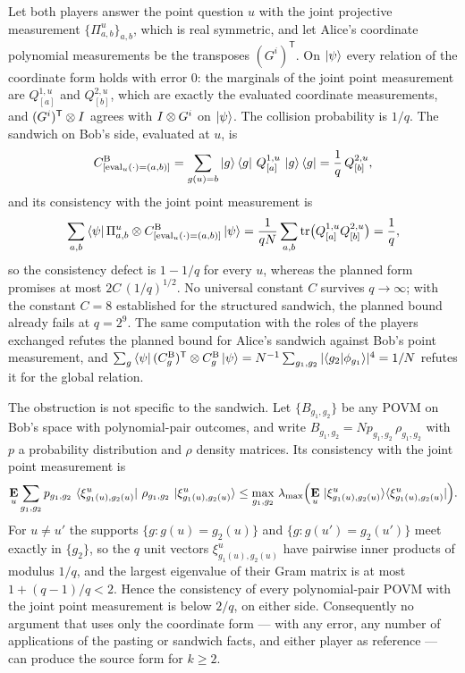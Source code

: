\documentclass[11pt]{article}
\begin{document}
Let both players answer the point question $u$ with the joint projective
measurement $\{\Pi^u_{a,b}\}_{a,b}$, which is real symmetric, and let Alice's
coordinate polynomial measurements be the transposes $(G^{i})^{\mathsf T}$.
On $\ket{\psi}$ every relation of the coordinate form holds with error
$0$: the marginals of the joint point measurement are $Q^{1,u}_{[a]}$ and
$Q^{2,u}_{[b]}$, which are exactly the evaluated coordinate measurements, and
$(G^i)^{\mathsf T} \otimes I$ agrees with $I \otimes G^i$ on $\ket{\psi}$.  The
collision probability is $1/q$.  The sandwich on Bob's side, evaluated at
$u$, is
\[
  C^{\mathrm B}_{[\mathrm{eval}_u(\cdot) = (a,b)]}
    = \sum_{g(u) = b} \ket{g}\bra{g}\, Q^{1,u}_{[a]}\, \ket{g}\bra{g}
    = \frac1q\, Q^{2,u}_{[b]},
\]
and its consistency with the joint point measurement is
\[
  \sum_{a,b} \bra{\psi} \Pi^u_{a,b} \otimes C^{\mathrm B}_{[\mathrm{eval}_u(\cdot) = (a,b)]}
    \ket{\psi}
    = \frac{1}{qN} \sum_{a,b} \mathrm{tr}\bigl(Q^{1,u}_{[a]} Q^{2,u}_{[b]}\bigr)
    = \frac1q ,
\]
so the consistency defect is $1 - 1/q$ for every $u$, whereas the planned
form promises at most $2C\,(1/q)^{1/2}$.  No universal constant $C$ survives
$q \to \infty$; with the constant $C = 8$ established for the structured
sandwich, the planned bound already fails at $q = 2^{9}$.  The same
computation with the roles of the players exchanged refutes the planned
bound for Alice's sandwich against Bob's point measurement, and
$\sum_{g} \bra{\psi} (C^{\mathrm B}_g)^{\mathsf T} \otimes C^{\mathrm B}_g \ket{\psi}
= N^{-1} \sum_{g_1,g_2} |\langle g_2 | \phi_{g_1}\rangle|^4 = 1/N$ refutes it
for the global relation.

The obstruction is not specific to the sandwich.  Let
$\{B_{g_1,g_2}\}$ be any POVM on Bob's space with polynomial-pair outcomes,
and write $B_{g_1,g_2} = N p_{g_1,g_2}\,\rho_{g_1,g_2}$ with
$p$ a probability distribution and $\rho$ density matrices.  Its
consistency with the joint point measurement is
\[
  \mathop{\bf E\/}_{u} \sum_{g_1,g_2} p_{g_1,g_2}\,
    \bra{\xi^u_{g_1(u),g_2(u)}}\, \rho_{g_1,g_2}\, \ket{\xi^u_{g_1(u),g_2(u)}}
  \le \max_{g_1,g_2}\,
    \lambda_{\max}\Bigl(\mathop{\bf E\/}_{u}\, \ket{\xi^u_{g_1(u),g_2(u)}}\!\bra{\xi^u_{g_1(u),g_2(u)}}\Bigr).
\]
For $u \ne u'$ the supports $\{g : g(u) = g_2(u)\}$ and
$\{g : g(u') = g_2(u')\}$ meet exactly in $\{g_2\}$, so the $q$ unit vectors
$\xi^u_{g_1(u),g_2(u)}$ have pairwise inner products of modulus $1/q$, and
the largest eigenvalue of their Gram matrix is at most $1 + (q-1)/q < 2$.
Hence the consistency of every polynomial-pair POVM with the joint point
measurement is below $2/q$, on either side.  Consequently no argument that
uses only the coordinate form --- with any error, any number of applications
of the pasting or sandwich facts, and either player as reference --- can
produce the source form for $k \ge 2$.
\end{document}
